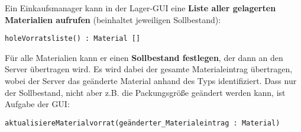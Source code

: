 Ein Einkaufsmanager kann in der Lager-GUI eine \textbf{Liste aller gelagerten Materialien aufrufen} (beinhaltet jeweiligen Sollbestand):

\texttt{holeVorratsliste() : Material []}

Für alle Materialien kann er einen \textbf{Sollbestand festlegen}, der dann an den Server übertragen wird. Es wird dabei der gesamte Materialeintrag übertragen, wobei der Server das geänderte Material anhand des Typs identifiziert. Dass nur der Sollbestand, nicht aber z.B. die Packungsgröße geändert werden kann, ist Aufgabe der GUI:

\texttt{aktualisiereMaterialvorrat(geänderter\_Materialeintrag : Material)}